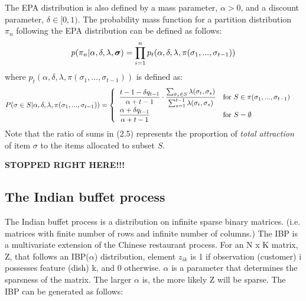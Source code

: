 \noindent
The EPA distribution is also defined by a mass parameter, $\alpha > 0$, and a discount
parameter, $\delta \in [0,1)$. The probability mass function for a partition 
distribution $\pi_n$ following the EPA distribution can be defined as follows:
\begin{equation}
  p(\pi_n|\alpha,\delta,\lambda,\bm\sigma)=
    \prod\limits_{i=1}^{n}p_t(\alpha,\delta,\lambda,\pi(\sigma_1,...,\sigma_{t-1}))
\end{equation}
where $p_t(\alpha,\delta,\lambda,\pi(\sigma_1,...,\sigma_{t-1}))$ is defined as:
\begin{equation}
  P(\sigma \in S | \alpha,\delta,\lambda,\pi(\sigma_1,...,\sigma_{t-1}))=
  \begin{cases}
    \begin{array}{ll}
      \displaystyle\frac{t-1-\delta q_{t-1}}{\alpha+t-1} \cdot 
        \frac{\sum_{\sigma_s \in S}\lambda(\sigma_t,\sigma_s)}
        {\sum_{s=1}^{t-1}\lambda(\sigma_t,\sigma_s)} & 
        \text{for }S \in \pi(\sigma_1,...,\sigma_{t-1})\\
      \displaystyle\frac{\alpha+\delta q_{t-1}}{\alpha+t-1} &  \text{for }S  = \emptyset \\
    \end{array}
  \end{cases}
\end{equation}
Note that the ratio of sums in (2.5) represents the proportion of \textit{total
attraction} of item $\sigma$ to the items allocated to subset $S$.



\noindent
\textbf{STOPPED RIGHT HERE!!!}



\subsection{The Indian buffet process}
The Indian buffet process is a distribution on infinite sparse binary matrices.
(i.e. matrices with finite number of rows and infinite number of columns.) The
IBP is a multivariate extension of the Chinese restaurant process. For an N x K
matrix, Z, that follows an IBP($\alpha$) distribution, element $z_{ik}$ is 1 if
observation (customer) i possesses feature (dish) k, and 0 otherwise.  
$\alpha$ is a parameter that determines the sparsness of the matrix. The larger
$\alpha$ is, the more likely Z will be sparse. The IBP can be generated as
follows: \\

